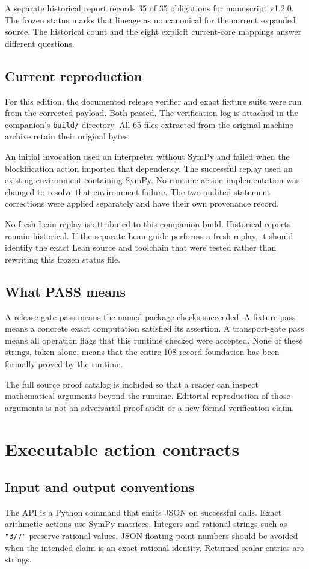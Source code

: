 \documentclass[a4paper,11pt]{article}
\begin{document}
A separate historical report records 35 of 35 obligations for manuscript v1.2.0. The frozen status marks that lineage as noncanonical for the current expanded source. The historical count and the eight explicit current-core mappings answer different questions.
\subsection{Current reproduction}
For this edition, the documented release verifier and exact fixture suite were run from the corrected payload. Both passed. The verification log is attached in the companion's \nolinkurl{build/} directory. All 65 files extracted from the original machine archive retain their original bytes.

An initial invocation used an interpreter without SymPy and failed when the blockification action imported that dependency. The successful replay used an existing environment containing SymPy. No runtime action implementation was changed to resolve that environment failure. The two audited statement corrections were applied separately and have their own provenance record.

No fresh Lean replay is attributed to this companion build. Historical reports remain historical. If the separate Lean guide performs a fresh replay, it should identify the exact Lean source and toolchain that were tested rather than rewriting this frozen status file.
\subsection{What PASS means}
A release-gate pass means the named package checks succeeded. A fixture pass means a concrete exact computation satisfied its assertion. A transport-gate pass means all operation flags that this runtime checked were accepted. None of these strings, taken alone, means that the entire 108-record foundation has been formally proved by the runtime.

The full source proof catalog is included so that a reader can inspect mathematical arguments beyond the runtime. Editorial reproduction of those arguments is not an adversarial proof audit or a new formal verification claim.

\section{Executable action contracts}
\subsection{Input and output conventions}
The API is a Python command that emits JSON on successful calls. Exact arithmetic actions use SymPy matrices. Integers and rational strings such as \nolinkurl{"3/7"} preserve rational values. JSON floating-point numbers should be avoided when the intended claim is an exact rational identity. Returned scalar entries are strings.
\end{document}
